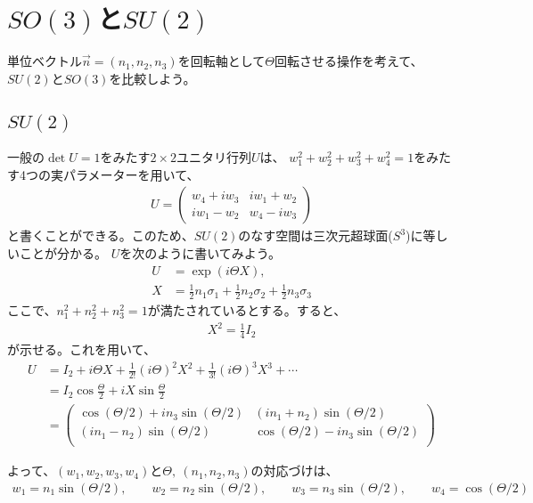 \documentclass[10pt,a4paper]{jarticle}
\begin{document}
\section{$SO(3)$と$SU(2)$}
単位ベクトル$\vec n = (n_1,n_2,n_3)$を回転軸として$\Theta$回転させる操作を考えて、$SU(2)$と$SO(3)$を比較しよう。

\subsection{$SU(2)$}
一般の$\det U = 1$をみたす$2\times 2$ユニタリ行列$U$は、
$w_1^2 + w_2^2 + w_3^2 + w_4^2 = 1$をみたす4つの実パラメーターを用いて、
\begin{align}
U = \left(\begin{array}{cc}
w_4 + i w_3 & iw_1 + w_2 \\
iw_1 - w_2 & w_4 - iw_3
\end{array}\right)
\end{align}
と書くことができる。このため、$SU(2)$のなす空間は三次元超球面($S^3$)に等しいことが分かる。
$U$を次のように書いてみよう。
\begin{align}
U &= \exp\left( i \Theta X \right), \\
X &= \frac{1}{2}n_1 \sigma_1 + \frac{1}{2}n_2 \sigma_2 + \frac{1}{2}n_3 \sigma_3
\end{align}
ここで、$n_1^2 + n_2^2 + n_3^2 = 1$が満たされているとする。すると、
\begin{align}
X^2 = \frac{1}{4} I_2
\end{align}
が示せる。これを用いて、
\begin{align}
U
&= I_2 + i \Theta X + \frac{1}{2!}(i\Theta)^2 X^2  + \frac{1}{3!}(i\Theta)^3 X^3 + \cdots \nonumber\\
&= I_2 \cos\frac{\Theta}{2} + i X \sin\frac{\Theta}{2} \nonumber\\
&= \left(\begin{array}{cc}
	\cos(\Theta/2) + i n_3 \sin(\Theta/2) & (in_1 + n_2) \sin(\Theta/2) \\
	(in_1 - n_2) \sin(\Theta/2) & \cos(\Theta/2) - i n_3 \sin(\Theta/2) \\
\end{array}\right)
\end{align}

よって、$(w_1,w_2,w_3,w_4)$と$\Theta,~(n_1,n_2,n_3)$の対応づけは、
\begin{align}
w_1 = n_1\sin(\Theta/2), \qquad
w_2 = n_2\sin(\Theta/2), \qquad
w_3 = n_3\sin(\Theta/2), \qquad
w_4 = \cos(\Theta/2)
\end{align}
\end{document}
